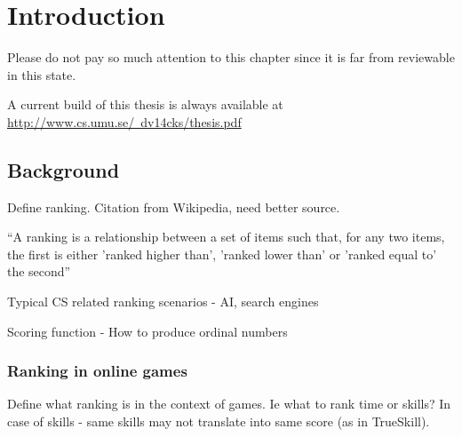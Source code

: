 \chapter{Introduction}

\begin{mdframed}[backgroundcolor=red,innerleftmargin=15pt,leftmargin=-10pt,rightmargin=-10pt, innerrightmargin=15pt,innertopmargin=10pt,innerbottommargin=10pt, fontcolor=white, skipabove=20pt, linewidth=0]

  Please do not pay so much attention to this chapter since it is far from reviewable in this state.

  A current build of this thesis is always available at \href{http://www.cs.umu.se/~dv14cks/thesis.pdf}{http://www.cs.umu.se/~dv14cks/thesis.pdf}

\end{mdframed}


\section{Background}

\begin{shaded}
  Define ranking. Citation from Wikipedia, need better source.
\end{shaded}
``A ranking is a relationship between a set of items such that, for any two items, the first is either 'ranked higher than', 'ranked lower than' or 'ranked equal to' the second''

\begin{shaded}
  Typical CS related ranking scenarios - AI, search engines
\end{shaded}
 


 
\begin{shaded}
  Scoring function - How to produce ordinal numbers 
\end{shaded}

\subsection{Ranking in online games}

\begin{shaded}
Define what ranking is in the context of games. Ie what to rank time or skills? In case of skills - same skills may not translate into same score (as in TrueSkill).  

\end{shaded}

